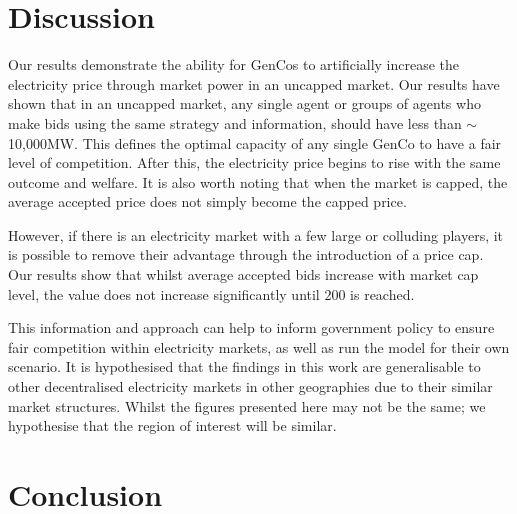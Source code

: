
\section{Discussion}
\label{rl:sec:discussion}

Our results demonstrate the ability for GenCos to artificially increase the electricity price through market power in an uncapped market. Our results have shown that in an uncapped market, any single agent or groups of agents who make bids using the same strategy and information, should have less than ${\sim}$10,000MW. This defines the optimal capacity of any single GenCo to have a fair level of competition. After this, the electricity price begins to rise with the same outcome and welfare. It is also worth noting that when the market is capped, the average accepted price does not simply become the capped price.

However, if there is an electricity market with a few large or colluding players, it is possible to remove their advantage through the introduction of a price cap. Our results show that whilst average accepted bids increase with market cap level, the value does not increase significantly until \textsterling$200$ is reached.


This information and approach can help to inform government policy to ensure fair competition within electricity markets, as well as run the model for their own scenario. It is hypothesised that the findings in this work are generalisable to other decentralised electricity markets in other geographies due to their similar market structures. Whilst the figures presented here may not be the same; we hypothesise that the region of interest will be similar.



\section{Conclusion}
\label{rl:sec:conclusion}

